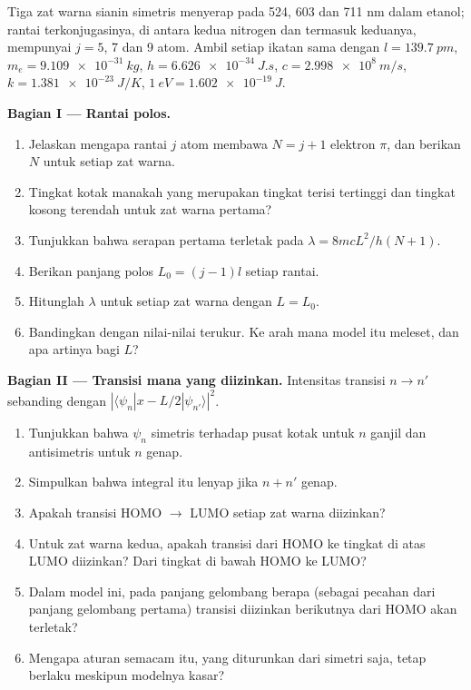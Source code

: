 \begin{problem}
\label{pb:b3:quantum-model-systems:1}
Tiga zat warna sianin simetris menyerap pada 524, 603 dan 711 nm dalam
etanol; rantai terkonjugasinya, di antara kedua nitrogen dan termasuk
keduanya, mempunyai $j = 5$, 7 dan 9 atom. Ambil setiap ikatan sama dengan
$l = \qty{139.7}{pm}$, $m_e =
\qty{9.109e-31}{kg}$, $h = \qty{6.626e-34}{J.s}$, $c = \qty{2.998e8}{m/s}$,
$k = \qty{1.381e-23}{J/K}$, $\qty{1}{eV} = \qty{1.602e-19}{J}$.

\medskip\noindent\textbf{Bagian I --- Rantai polos.}
\begin{enumerate}[beginpenalty=10000]
  \item Jelaskan mengapa rantai $j$ atom membawa $N = j + 1$ elektron $\pi$,
        dan berikan $N$ untuk setiap zat warna.
  \item Tingkat kotak manakah yang merupakan tingkat terisi tertinggi dan
        tingkat kosong terendah untuk zat warna pertama?
  \item Tunjukkan bahwa serapan pertama terletak pada $\lambda = 8mcL^2/h(N+1)$.
  \item Berikan panjang polos $L_0 = (j - 1)l$ setiap rantai.
  \item Hitunglah $\lambda$ untuk setiap zat warna dengan $L = L_0$.
  \item Bandingkan dengan nilai-nilai terukur. Ke arah mana model itu
        meleset, dan apa artinya bagi $L$?
\end{enumerate}

\medskip\noindent\textbf{Bagian II --- Transisi mana yang diizinkan.}
Intensitas transisi $n \to n'$ sebanding dengan $|\langle
\psi_n|x - L/2|\psi_{n'}\rangle|^2$.
\begin{enumerate}[resume]
  \item Tunjukkan bahwa $\psi_n$ simetris terhadap pusat kotak untuk $n$
        ganjil dan antisimetris untuk $n$ genap.
  \item Simpulkan bahwa integral itu lenyap jika $n + n'$ genap.
  \item Apakah transisi HOMO $\to$ LUMO setiap zat warna diizinkan?
  \item Untuk zat warna kedua, apakah transisi dari HOMO ke tingkat di atas
        LUMO diizinkan? Dari tingkat di bawah HOMO ke LUMO?
  \item Dalam model ini, pada panjang gelombang berapa (sebagai pecahan dari
        panjang gelombang pertama) transisi diizinkan berikutnya dari HOMO
        akan terletak?
  \item Mengapa aturan semacam itu, yang diturunkan dari simetri saja,
        tetap berlaku meskipun modelnya kasar?
\end{enumerate}


\end{problem}
